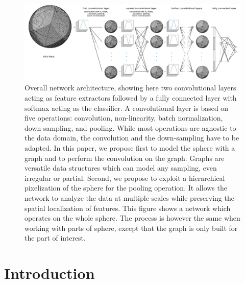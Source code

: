 \documentclass[final,twocolumn,3p,times,authoryear]{elsarticle}
\newcommand{\nati}[1]{{\color[rgb]{.1,.6,.1}{#1}}}
\newcommand{\1}{\b{1}}              %
\newcommand{\0}{\b{0}}              %
\begin{document}
\begin{figure}
	\centering
	\includegraphics[width=\linewidth]{figure_architecture_v2}
	\caption{Overall network architecture, showing here two convolutional layers acting as feature extractors followed by a fully connected layer with softmax acting as the classifier. \nati{add the stat layer?} A convolutional layer is based on five operations: convolution, non-linearity, batch normalization, down-sampling, and pooling. While most operations are agnostic to the data domain, the convolution and the down-sampling have to be adapted. In this paper, we propose first to model the sphere with a graph and to perform the convolution on the graph. Graphs are versatile data structures which can model any sampling, even irregular or partial. Second, we propose to exploit a hierarchical pixelization of the sphere for the pooling operation. It allows the network to analyze the data at multiple scales while preserving the spatial localization of features. This figure shows a network which operates on the whole sphere. The process is however the same when working with parts of sphere, except that the graph is only built for the part of interest.}
	\label{fig:architecture}
\end{figure}

\section{Introduction}
\label{sec:intro}

\end{document}
